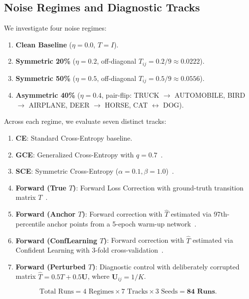 \documentclass[journal]{IEEEtran}
\theoremstyle{definition}
\begin{document}
\subsection{Noise Regimes and Diagnostic Tracks}
We investigate four noise regimes:
\begin{enumerate}
    \item \textbf{Clean Baseline} ($\eta = 0.0$, $T = I$).
    \item \textbf{Symmetric 20\%} ($\eta = 0.2$, off-diagonal $T_{ij} = 0.2/9 \approx 0.0222$).
    \item \textbf{Symmetric 50\%} ($\eta = 0.5$, off-diagonal $T_{ij} = 0.5/9 \approx 0.0556$).
    \item \textbf{Asymmetric 40\%} ($\eta = 0.4$, pair-flip: TRUCK $\to$ AUTOMOBILE, BIRD $\to$ AIRPLANE, DEER $\to$ HORSE, CAT $\leftrightarrow$ DOG).
\end{enumerate}

Across each regime, we evaluate seven distinct tracks:
\begin{enumerate}
    \item \textbf{CE}: Standard Cross-Entropy baseline.
    \item \textbf{GCE}: Generalized Cross-Entropy with $q = 0.7$~\cite{zhang2018generalized}.
    \item \textbf{SCE}: Symmetric Cross-Entropy ($\alpha = 0.1, \beta = 1.0$)~\cite{wang2019symmetric}.
    \item \textbf{Forward (True $T$)}: Forward Loss Correction with ground-truth transition matrix $T$~\cite{patrini2017making}.
    \item \textbf{Forward (Anchor $T$)}: Forward correction with $\hat{T}$ estimated via 97th-percentile anchor points from a 5-epoch warm-up network~\cite{patrini2017making}.
    \item \textbf{Forward (ConfLearning $T$)}: Forward correction with $\hat{T}$ estimated via Confident Learning with 3-fold cross-validation~\cite{northcutt2021confident}.
    \item \textbf{Forward (Perturbed $T$)}: Diagnostic control with deliberately corrupted matrix $\hat{T} = 0.5 T + 0.5 \mathbf{U}$, where $\mathbf{U}_{ij} = 1/K$.
\end{enumerate}
$$\text{Total Runs} = 4 \text{ Regimes} \times 7 \text{ Tracks} \times 3 \text{ Seeds} = \mathbf{84 \text{ Runs}}.$$
\end{document}
